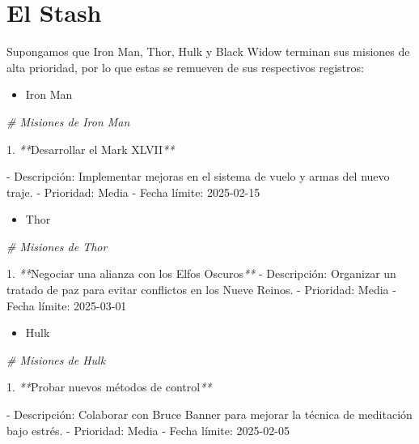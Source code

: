 \documentclass[
]{book}
\newenvironment{Shaded}{\begin{snugshade}}{\end{snugshade}}
\newcommand{\CommentTok}[1]{\textcolor[rgb]{0.56,0.35,0.01}{\textit{#1}}}
\newcommand{\ExtensionTok}[1]{#1}
\newcommand{\NormalTok}[1]{#1}
\newcommand{\PreprocessorTok}[1]{\textcolor[rgb]{0.56,0.35,0.01}{\textit{#1}}}
\providecommand{\tightlist}{%
  \setlength{\itemsep}{0pt}\setlength{\parskip}{0pt}}
\begin{document}
\section{El Stash}\label{el-stash}

Supongamos que Iron Man, Thor, Hulk y Black Widow terminan sus misiones de alta prioridad, por lo que estas se remueven de sus respectivos registros:

\begin{itemize}
\tightlist
\item
  Iron Man
\end{itemize}

\begin{Shaded}
\begin{Highlighting}[]
\CommentTok{\# Misiones de Iron Man}

\ExtensionTok{1.} \PreprocessorTok{**}\NormalTok{Desarrollar el Mark XLVII}\PreprocessorTok{**}

   \ExtensionTok{{-}}\NormalTok{ Descripción: Implementar mejoras en el sistema de vuelo y armas del nuevo traje.}
   \ExtensionTok{{-}}\NormalTok{ Prioridad: Media}
   \ExtensionTok{{-}}\NormalTok{ Fecha límite: 2025{-}02{-}15}
\end{Highlighting}
\end{Shaded}

\begin{itemize}
\tightlist
\item
  Thor
\end{itemize}

\begin{Shaded}
\begin{Highlighting}[]
\CommentTok{\# Misiones de Thor}

\ExtensionTok{1.} \PreprocessorTok{**}\NormalTok{Negociar una alianza con los Elfos Oscuros}\PreprocessorTok{**}
   \ExtensionTok{{-}}\NormalTok{ Descripción: Organizar un tratado de paz para evitar conflictos en los Nueve Reinos.}
   \ExtensionTok{{-}}\NormalTok{ Prioridad: Media}
   \ExtensionTok{{-}}\NormalTok{ Fecha límite: 2025{-}03{-}01}
\end{Highlighting}
\end{Shaded}

\begin{itemize}
\tightlist
\item
  Hulk
\end{itemize}

\begin{Shaded}
\begin{Highlighting}[]
\CommentTok{\# Misiones de Hulk}

\ExtensionTok{1.} \PreprocessorTok{**}\NormalTok{Probar nuevos métodos de control}\PreprocessorTok{**}

   \ExtensionTok{{-}}\NormalTok{ Descripción: Colaborar con Bruce Banner para mejorar la técnica de meditación bajo estrés.}
   \ExtensionTok{{-}}\NormalTok{ Prioridad: Media}
   \ExtensionTok{{-}}\NormalTok{ Fecha límite: 2025{-}02{-}05}
\end{Highlighting}
\end{Shaded}
\end{document}
